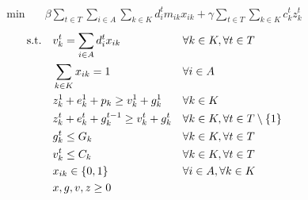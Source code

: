 \begin{align}
    \min\quad       & \beta \sum_{t \in T} \sum_{i \in A} \sum_{k \in K}{d^t_i m_{ik} x_{ik}} + \gamma \sum_{t \in T} \sum_{k \in K}{c_k^t z_k^t}
    \label{eq:migrinf-obj}
\end{align}
\vspace*{-6mm}
\begin{align}
    \text{s.t.\quad}
    \label{eq:migrinf-c1}
    & v_k^t = \sum_{i \in A}{d^t_i x_{ik}}          &   & \forall k \in K, \forall t \in T                 \\
    \label{eq:migrinf-c2}
    & \sum_{k \in K}{x_{ik}} = 1                    &   & \forall i \in A                                  \\
    \label{eq:migrinf-c3}
    & z_k^1 + e_k^1 + p_k \geq v_k^1 + g_k^1        &   & \forall k \in K                                  \\
    \label{eq:migrinf-c4}
    & z_k^t + e_k^t + g_k^{t-1} \geq v_k^t + g_k^t  &   & \forall k \in K, \forall t \in T \setminus \{1\} \\
    \label{eq:migrinf-c5}
    & g_k^t \leq G_k                                &   & \forall k \in K, \forall t \in T                 \\
    \label{eq:migrinf-c6}
    & v_k^t \leq C_k                                &   & \forall k \in K, \forall t \in T                 \\
    \label{eq:migrinf-c7}
    & x_{ik} \in \{0,1\}                            &   & \forall i \in A, \forall k \in K                 \\
    \label{eq:migrinf-c8}
    & x, g, v, z \geq 0                             &   &
\end{align}
